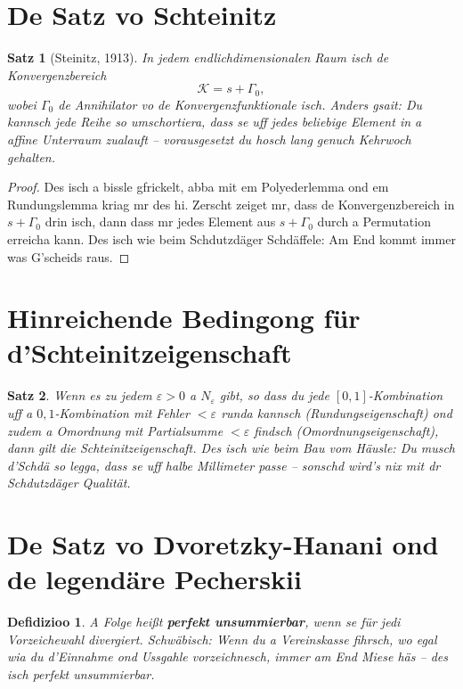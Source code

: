 \documentclass[12pt,a4paper]{scrbook}
\newtheorem{theorem}{Satz}[chapter]
\newtheorem{definition}{Defidizioo}[chapter]
\begin{document}
	\section{De Satz vo Schteinitz}
	\begin{theorem}[Steinitz, 1913]
		In jedem endlichdimensionalen Raum isch de Konvergenzbereich 
		\[
		\mathcal{K} = s + \Gamma_0,
		\]
		wobei \(\Gamma_0\) de Annihilator vo de Konvergenzfunktionale isch. Anders gsait: Du kannsch jede Reihe so umschortiera, dass se uff jedes beliebige Element in a affine Unterraum zualauft – vorausgesetzt du hosch lang genuch Kehrwoch gehalten.
	\end{theorem}
	
	\begin{proof}
		Des isch a bissle gfrickelt, abba mit em Polyederlemma ond em Rundungslemma kriag mr des hi. Zerscht zeiget mr, dass de Konvergenzbereich in \(s+\Gamma_0\) drin isch, dann dass mr jedes Element aus \(s+\Gamma_0\) durch a Permutation erreicha kann. Des isch wie beim Schdutzdäger Schdäffele: Am End kommt immer was G’scheids raus.
	\end{proof}
	
	\section{Hinreichende Bedingong für d’Schteinitzeigenschaft}
	\begin{theorem}
		Wenn es zu jedem \(\varepsilon>0\) a \(N_\varepsilon\) gibt, so dass du jede \([0,1]\)-Kombination uff a \(0,1\)-Kombination mit Fehler \(<\varepsilon\) runda kannsch (Rundungseigenschaft) ond zudem a Omordnung mit Partialsumme \(<\varepsilon\) findsch (Omordnungseigenschaft), dann gilt die Schteinitzeigenschaft. Des isch wie beim Bau vom Häusle: Du musch d’Schdä so legga, dass se uff halbe Millimeter passe – sonschd wird’s nix mit dr Schdutzdäger Qualität.
	\end{theorem}
	
	\section{De Satz vo Dvoretzky-Hanani ond de legendäre Pecherskii}
	\begin{definition}
		A Folge heißt \textbf{perfekt unsummierbar}, wenn se für jedi Vorzeichewahl divergiert. Schwäbisch: Wenn du a Vereinskasse fihrsch, wo egal wia du d’Einnahme ond Ussgahle vorzeichnesch, immer am End Miese häs – des isch perfekt unsummierbar.
	\end{definition}
	
\end{document}
